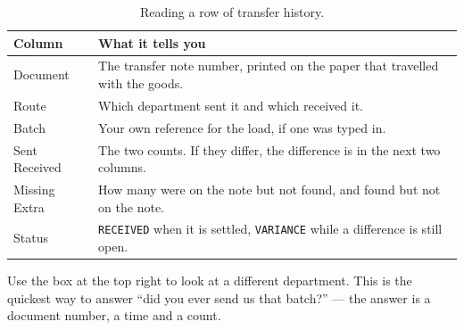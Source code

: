 \begin{table}[H]
\centering
\small
\begin{tabular}{@{}p{24mm}p{110mm}@{}}
\toprule
\textbf{Column} & \textbf{What it tells you} \\
\midrule
Document & The transfer note number, printed on the paper that travelled with the goods. \\
Route    & Which department sent it and which received it. \\
Batch    & Your own reference for the load, if one was typed in. \\
Sent \newline Received & The two counts. If they differ, the difference is in the next two columns. \\
Missing \newline Extra & How many were on the note but not found, and found but not on the note. \\
Status   & \texttt{RECEIVED} when it is settled, \texttt{VARIANCE} while a difference is still open. \\
\bottomrule
\end{tabular}
\caption{Reading a row of transfer history.}
\end{table}

\begin{tipbox}
Use the  box at the top right to look at a different department.
This is the quickest way to answer ``did you ever send us that batch?'' --- the
answer is a document number, a time and a count.
\end{tipbox}

